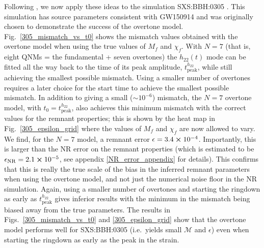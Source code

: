 Following \cite{overtones}, we now apply these ideas to the simulation SXS:BBH:0305 \cite{2016CQGra..33x4002L, sxs_catalog}.
This simulation has source parameters consistent with GW150914 and was originally chosen to demonstrate the success of the overtone model. 
Fig.~\ref{305_mismatch_vs_t0} shows the mismatch values obtained with the overtone model when using the true values of $M_f$ and $\chi_f$.
With $N=7$ (that is, eight QNMs = the fundamental + seven overtones) the $h_{22}(t)$ mode can be fitted all the way back to the time of its peak amplitude, $t_{\mathrm{peak}}^{h_{22}}$, while still achieving the smallest possible mismatch.
Using a smaller number of overtones requires a later choice for the start time to achieve the smallest possible mismatch.
In addition to giving a small ($\sim 10^{-6}$) mismatch, the $N=7$ overtone model, with $t_0 = t_{\mathrm{peak}}^{h_{22}}$, also achieves this minimum mismatch with the correct values for the remnant properties; this is shown by the heat map in Fig.~\ref{305_epsilon_grid} where the values of $M_f$ and $\chi_f$ are now allowed to vary. 
We find, for the $N=7$ model, a remnant error $\epsilon = 3.4 \cross 10^{-4}$. 
Importantly, this is larger than the NR error on the remnant properties (which is estimated to be $\epsilon_{\mathrm{NR}} = 2.1 \cross 10^{-5}$, see appendix \ref{NR_error_appendix} for details). This confirms that this is really the true scale of the bias in the inferred remnant parameters when using the overtone model, and not just the numerical noise floor in the NR simulation.
Again, using a smaller number of overtones and starting the ringdown as early as $t_{\mathrm{peak}}^{h_{22}}$ gives inferior results with the minimum in the mismatch being biased away from the true parameters.
The results in Figs.~\ref{305_mismatch_vs_t0} and \ref{305_epsilon_grid} show that the overtone model performs well for SXS:BBH:0305 (i.e.\ yields small $\mathcal{M}$ and $\epsilon$) even when starting the ringdown as early as the peak in the strain.

